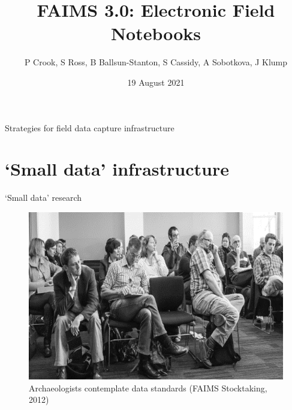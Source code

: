 \documentclass[aspectratio=169, 12pt]{beamer} %
\title{FAIMS 3.0: Electronic Field Notebooks} %
\author{P Crook, S Ross, B Ballsun-Stanton, S Cassidy, A Sobotkova, J Klump}   %
\institute{Australian Astronomical Optics seminar}   %
\date{19 August 2021}    %
\begin{document}

\maketitle

 


\begin{frame}{Strategies for field data capture infrastructure}
  \tableofcontents
\end{frame}

%



\section{`Small data' infrastructure}

\begin{frame}{`Small data' research}
 \begin{figure}[H]
    \centering
        \includegraphics[height=.75\textheight]{figures/Archaeologists-standards.png}
        \caption{Archaeologists contemplate data standards (FAIMS Stocktaking, 2012)}
        \label{fig:figure7}
 \end{figure}
\end{frame}
\end{document}
